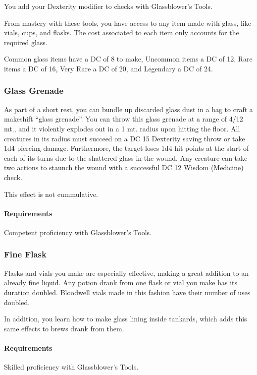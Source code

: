     You add your Dexterity modifier to checks with Glassblower's Tools.

    From mastery with these tools, you have access to any item made with glass, like vials, cups, and flasks.
    The cost associated to each item only accounts for the required glass.

    Common glass items have a DC of 8 to make, Uncommon items a DC of 12, Rare items a DC of 16, Very Rare a DC of 20, and Legendary a DC of 24.

\subsubsection{Glass Grenade} \label{feat::glassgrenade}
    As part of a short rest, you can bundle up discarded glass dust in a bag to craft a makeshift ``glass grenade''.
    You can throw this glass grenade at a range of 4/12 mt., and it violently explodes out in a 1 mt. radius upon hitting the floor.
    All creatures in its radius must succeed on a DC 15 Dexterity saving throw or take 1d4 piercing damage.
    Furthermore, the target loses 1d4 hit points at the start of each of its turns due to the shattered glass in the wound.
    Any creature can take two actions to staunch the wound with a successful DC 12 Wisdom (Medicine) check.

    This effect is not cummulative.
    \paragraph{Requirements} Competent proficiency with Glassblower's Tools.
\subsubsection{Fine Flask} \label{feat::fineflask}
    Flasks and vials you make are especially effective, making a great addition to an already fine liquid.
    Any potion drank from one flask or vial you make has its duration doubled.
    Bloodwell vials made in this fashion have their number of uses doubled.

    In addition, you learn how to make glass lining inside tankards, which adds this same effects to brews drank from them.
    \paragraph{Requirements} Skilled proficiency with Glassblower's Tools.
